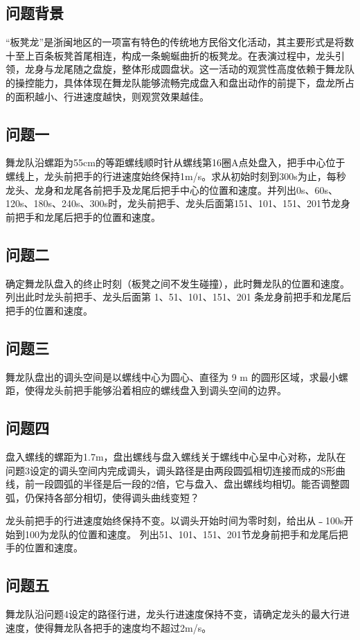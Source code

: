 \documentclass[../main.tex]{subfiles}
\begin{document}
\subsection{问题背景}
“板凳龙”是浙闽地区的一项富有特色的传统地方民俗文化活动，其主要形式是将数十至上百条板凳首尾相连，构成一条蜿蜒曲折的板凳龙。在表演过程中，龙头引领，龙身与龙尾随之盘旋，整体形成圆盘状。这一活动的观赏性高度依赖于舞龙队的操控能力，具体体现在舞龙队能够流畅完成盘入和盘出动作的前提下，盘龙所占的面积越小、行进速度越快，则观赏效果越佳。  

\subsection{问题一}

舞龙队沿螺距为55cm的等距螺线顺时针从螺线第16圈A点处盘入，把手中心位于螺线上，龙头前把手的行进速度始终保持1m/s。求从初始时刻到300s为止，每秒龙头、龙身和龙尾各前把手及龙尾后把手中心的位置和速度。并列出0s、60s、120s、180s、240s、300s时，龙头前把手、龙头后面第151、101、151、201节龙身前把手和龙尾后把手的位置和速度。

\subsection{问题二}
确定舞龙队盘入的终止时刻（板凳之间不发生碰撞），此时舞龙队的位置和速度。列出此时龙头前把手、龙头后面第 1、51、101、151、201 条龙身前把手和龙尾后把手的位置和速度。

\subsection{问题三}
舞龙队盘出的调头空间是以螺线中心为圆心、直径为 9 m 的圆形区域，求最小螺距，使得龙头前把手能够沿着相应的螺线盘入到调头空间的边界。
\subsection{问题四}
盘入螺线的螺距为1.7m，盘出螺线与盘入螺线关于螺线中心呈中心对称，龙队在问题3设定的调头空间内完成调头，调头路径是由两段圆弧相切连接而成的S形曲线，前一段圆弧的半径是后一段的2倍，它与盘入、盘出螺线均相切。能否调整圆弧，仍保持各部分相切，使得调头曲线变短？
\par 龙头前把手的行进速度始终保持不变。以调头开始时间为零时刻，给出从﹣100s开始到100为龙队的位置和速度。
列出51、101、151、201节龙身前把手和龙尾后把手的位置和速度。

\subsection{问题五}
舞龙队沿问题4设定的路径行进，龙头行进速度保持不变，请确定龙头的最大行进速度，使得舞龙队各把手的速度均不超过2m/s。
\end{document}
